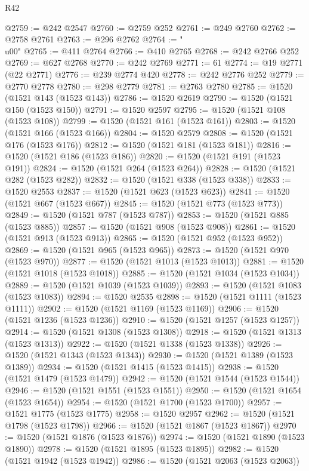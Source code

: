 \begin{lexlean}{R42}
\begin{coremodule}
{@2759 := @242 @2547
@2760 := @2759 @252
@2761 := @249 @2760
@2762 := @2758 @2761
@2763 := @296 @2762
@2764 := "\\u00"
@2765 := @411 @2764
@2766 := @410 @2765
@2768 := @242 @2766 @252
@2769 := @627 @2768
@2770 := @242 @2769
@2771 := 61
@2774 := @19 @2771 (@22 @2771)
@2776 := @239 @2774 @420
@2778 := @242 @2776 @252
@2779 := @2770 @2778
@2780 := @298 @2779
@2781 := @2763 @2780
@2785 := @1520 (@1521 @143 (@1523 @143))
@2786 := @1520 @2619
@2790 := @1520 (@1521 @150 (@1523 @150))
@2791 := @1520 @2597
@2795 := @1520 (@1521 @108 (@1523 @108))
@2799 := @1520 (@1521 @161 (@1523 @161))
@2803 := @1520 (@1521 @166 (@1523 @166))
@2804 := @1520 @2579
@2808 := @1520 (@1521 @176 (@1523 @176))
@2812 := @1520 (@1521 @181 (@1523 @181))
@2816 := @1520 (@1521 @186 (@1523 @186))
@2820 := @1520 (@1521 @191 (@1523 @191))
@2824 := @1520 (@1521 @264 (@1523 @264))
@2828 := @1520 (@1521 @282 (@1523 @282))
@2832 := @1520 (@1521 @338 (@1523 @338))
@2833 := @1520 @2553
@2837 := @1520 (@1521 @623 (@1523 @623))
@2841 := @1520 (@1521 @667 (@1523 @667))
@2845 := @1520 (@1521 @773 (@1523 @773))
@2849 := @1520 (@1521 @787 (@1523 @787))
@2853 := @1520 (@1521 @885 (@1523 @885))
@2857 := @1520 (@1521 @908 (@1523 @908))
@2861 := @1520 (@1521 @913 (@1523 @913))
@2865 := @1520 (@1521 @952 (@1523 @952))
@2869 := @1520 (@1521 @965 (@1523 @965))
@2873 := @1520 (@1521 @970 (@1523 @970))
@2877 := @1520 (@1521 @1013 (@1523 @1013))
@2881 := @1520 (@1521 @1018 (@1523 @1018))
@2885 := @1520 (@1521 @1034 (@1523 @1034))
@2889 := @1520 (@1521 @1039 (@1523 @1039))
@2893 := @1520 (@1521 @1083 (@1523 @1083))
@2894 := @1520 @2535
@2898 := @1520 (@1521 @1111 (@1523 @1111))
@2902 := @1520 (@1521 @1169 (@1523 @1169))
@2906 := @1520 (@1521 @1236 (@1523 @1236))
@2910 := @1520 (@1521 @1257 (@1523 @1257))
@2914 := @1520 (@1521 @1308 (@1523 @1308))
@2918 := @1520 (@1521 @1313 (@1523 @1313))
@2922 := @1520 (@1521 @1338 (@1523 @1338))
@2926 := @1520 (@1521 @1343 (@1523 @1343))
@2930 := @1520 (@1521 @1389 (@1523 @1389))
@2934 := @1520 (@1521 @1415 (@1523 @1415))
@2938 := @1520 (@1521 @1479 (@1523 @1479))
@2942 := @1520 (@1521 @1544 (@1523 @1544))
@2946 := @1520 (@1521 @1551 (@1523 @1551))
@2950 := @1520 (@1521 @1654 (@1523 @1654))
@2954 := @1520 (@1521 @1700 (@1523 @1700))
@2957 := @1521 @1775 (@1523 @1775)
@2958 := @1520 @2957
@2962 := @1520 (@1521 @1798 (@1523 @1798))
@2966 := @1520 (@1521 @1867 (@1523 @1867))
@2970 := @1520 (@1521 @1876 (@1523 @1876))
@2974 := @1520 (@1521 @1890 (@1523 @1890))
@2978 := @1520 (@1521 @1895 (@1523 @1895))
@2982 := @1520 (@1521 @1942 (@1523 @1942))
@2986 := @1520 (@1521 @2063 (@1523 @2063))
}
\end{coremodule}
\end{lexlean}
